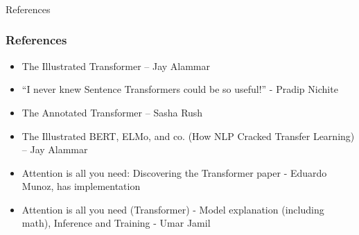 \begin{frame}[fragile]\frametitle{}
\begin{center}
{\Large References}
\end{center}
\end{frame}

\begin{frame}[fragile]\frametitle{References}
		\begin{itemize}
		\item The Illustrated Transformer – Jay Alammar
		\item ``I never knew Sentence Transformers could be so useful!'' - Pradip Nichite
		\item The Annotated Transformer – Sasha Rush
		\item The Illustrated BERT, ELMo, and co. (How NLP Cracked Transfer Learning) – Jay Alammar
		\item Attention is all you need: Discovering the Transformer paper - Eduardo Munoz, has implementation
		\item Attention is all you need (Transformer) - Model explanation (including math), Inference and Training - Umar Jamil
		\end{itemize}
\end{frame}



